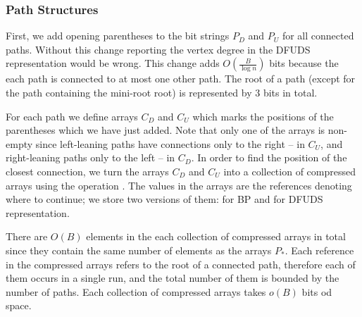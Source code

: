 \subsubsection{Path Structures}

First, we add opening parentheses to the bit strings $P_D$ and $P_U$ for all connected paths.
Without this change reporting the vertex degree in the DFUDS representation would be wrong.
This change adds $O(\frac{B}{\log n})$ bits because the each path is connected to at most one other path.
The root of a path (except for the path containing the mini-root root) is represented by $3$ bits in total.

For each path we define arrays $C_D$ and $C_U$ which marks the positions of the parentheses which we have just added.
Note that only one of the arrays is non-empty since left-leaning paths have connections only to the right -- in $C_U$, and right-leaning paths only to the left -- in $C_D$.
In order to find the position of the closest connection, we turn the arrays $C_D$ and $C_U$ into a collection of compressed arrays using the operation \succ{}.
The values in the arrays are the references denoting where to continue; we store two versions of them: for BP and for DFUDS representation.

There are $O(B)$ elements in the each collection of compressed arrays in total since they contain the same number of elements as the arrays $P_*$.
Each reference in the compressed arrays refers to the root of a connected path, therefore each of them occurs in a single run, and the total number of them is bounded by the number of paths.
Each collection of compressed arrays takes $o(B)$ bits od space.

